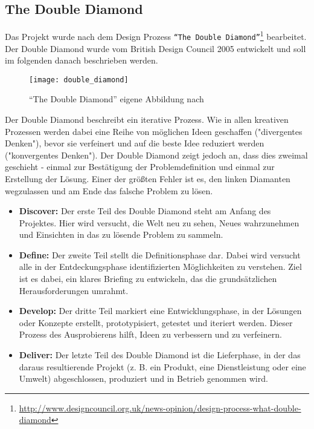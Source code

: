 \subsection{The Double Diamond}
\label{sub:the_double_diamond}
  Das Projekt wurde nach dem Design Prozess \texttt{"`The Double Diamond"'}\footnote{\url{http://www.designcouncil.org.uk/news-opinion/design-process-what-double-diamond}} bearbeitet. Der Double Diamond wurde vom British Design Council 2005 entwickelt und soll im folgenden danach beschrieben werden.\parencite{designcouncil}

  \begin{figure}[htbp]
    \begin{center}
      \texttt{[image: double\_diamond]}
      \caption{"`The Double Diamond"' eigene Abbildung nach \parencite{designcouncil}}
      \label{fig:double_diamond}
    \end{center}
  \end{figure}

  Der Double Diamond beschreibt ein iterative Prozess. Wie in allen kreativen Prozessen werden dabei eine Reihe von möglichen Ideen geschaffen ("divergentes Denken"), bevor sie verfeinert und auf die beste Idee reduziert werden ("konvergentes Denken"). Der Double Diamond zeigt jedoch an, dass dies zweimal geschieht - einmal zur Bestätigung der Problemdefinition und einmal zur Erstellung der Lösung. Einer der größten Fehler ist es, den linken Diamanten wegzulassen und am Ende das falsche Problem zu lösen.

  \begin{itemize}[label={}]
    \item \textbf{Discover:} Der erste Teil des Double Diamond steht am Anfang des Projektes. Hier wird versucht, die Welt neu zu sehen, Neues wahrzunehmen und Einsichten in das zu lösende Problem zu sammeln.

    \item \textbf{Define:} Der zweite Teil stellt die Definitionsphase dar. Dabei wird versucht alle in der Entdeckungsphase identifizierten Möglichkeiten zu verstehen. Ziel ist es dabei, ein klares Briefing zu entwickeln, das die grundsätzlichen Herausforderungen umrahmt.

    \item \textbf{Develop:} Der dritte Teil markiert eine Entwicklungsphase, in der Lösungen oder Konzepte erstellt, prototypisiert, getestet und iteriert werden. Dieser Prozess des Ausprobierens hilft, Ideen zu verbessern und zu verfeinern.

    \item \textbf{Deliver:} Der letzte Teil des Double Diamond ist die Lieferphase, in der das daraus resultierende Projekt (z. B. ein Produkt, eine Dienstleistung oder eine Umwelt) abgeschlossen, produziert und in Betrieb genommen wird.
  \end{itemize}

